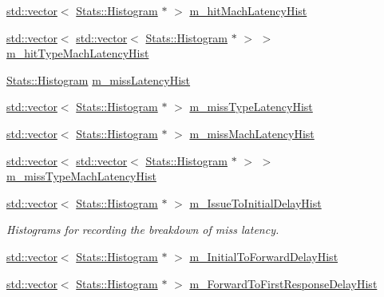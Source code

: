 \begin{DoxyCompactItemize}
\item 
\hyperlink{classstd_1_1vector}{std::vector}$<$ \hyperlink{classStats_1_1Histogram}{Stats::Histogram} $\ast$ $>$ \hyperlink{classProfiler_add8e2c73ddfe42f1b177e641a0e626d5}{m\_\-hitMachLatencyHist}
\item 
\hyperlink{classstd_1_1vector}{std::vector}$<$ \hyperlink{classstd_1_1vector}{std::vector}$<$ \hyperlink{classStats_1_1Histogram}{Stats::Histogram} $\ast$ $>$ $>$ \hyperlink{classProfiler_aaf855f02483dc21743651007a759ea77}{m\_\-hitTypeMachLatencyHist}
\item 
\hyperlink{classStats_1_1Histogram}{Stats::Histogram} \hyperlink{classProfiler_aff6841cbe8b6a9be485b4c45a8208f93}{m\_\-missLatencyHist}
\item 
\hyperlink{classstd_1_1vector}{std::vector}$<$ \hyperlink{classStats_1_1Histogram}{Stats::Histogram} $\ast$ $>$ \hyperlink{classProfiler_ac5a934c0abe9f0185357eb76de27dee3}{m\_\-missTypeLatencyHist}
\item 
\hyperlink{classstd_1_1vector}{std::vector}$<$ \hyperlink{classStats_1_1Histogram}{Stats::Histogram} $\ast$ $>$ \hyperlink{classProfiler_a55e994bce4da18f7600be6cbf7a4a3b5}{m\_\-missMachLatencyHist}
\item 
\hyperlink{classstd_1_1vector}{std::vector}$<$ \hyperlink{classstd_1_1vector}{std::vector}$<$ \hyperlink{classStats_1_1Histogram}{Stats::Histogram} $\ast$ $>$ $>$ \hyperlink{classProfiler_a8e022aebc37a4b83df56956874befd75}{m\_\-missTypeMachLatencyHist}
\item 
\hyperlink{classstd_1_1vector}{std::vector}$<$ \hyperlink{classStats_1_1Histogram}{Stats::Histogram} $\ast$ $>$ \hyperlink{classProfiler_a503562ca3d885333c87da80d05ee612a}{m\_\-IssueToInitialDelayHist}
\begin{DoxyCompactList}\small\item\em Histograms for recording the breakdown of miss latency. \item\end{DoxyCompactList}\item 
\hyperlink{classstd_1_1vector}{std::vector}$<$ \hyperlink{classStats_1_1Histogram}{Stats::Histogram} $\ast$ $>$ \hyperlink{classProfiler_a0dbfb83f6edf61cad3d0aebdc89ed370}{m\_\-InitialToForwardDelayHist}
\item 
\hyperlink{classstd_1_1vector}{std::vector}$<$ \hyperlink{classStats_1_1Histogram}{Stats::Histogram} $\ast$ $>$ \hyperlink{classProfiler_ae9bea11c9b001a155e7f7a0f39ac7bf9}{m\_\-ForwardToFirstResponseDelayHist}
\item 

\end{DoxyCompactItemize}
